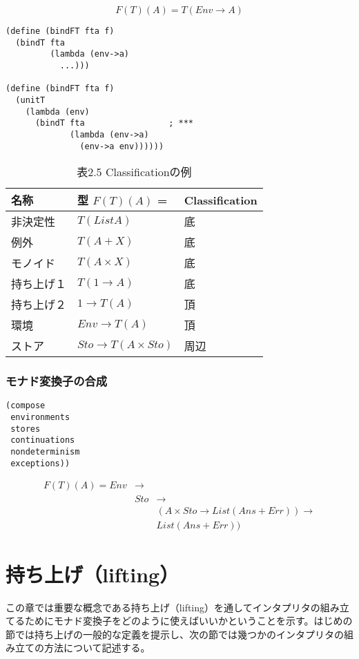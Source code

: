 \documentclass[11pt, oneside]{jsbook}   	%
\begin{document}
$$
F(T)(A) = T(Env \rightarrow A)
$$

\begin{lstlisting}
(define (bindFT fta f)
  (bindT fta
         (lambda (env->a)
           ...)))

(define (bindFT fta f)
  (unitT
    (lambda (env)
      (bindT fta                 ; ***
             (lambda (env->a)
               (env->a env))))))
\end{lstlisting}

\begin{table}[htb]
\label{table2.5}
\caption{表2.5 Classificationの例}
  \begin{tabular}{| l | l | l |} \hline
    名称   & 型 $F(T)(A)$ = & Classification  \\ \hline \hline
    非決定性     & $T(List A)$ & 底  \\
    例外            & $T(A + X)$ & 底  \\
    モノイド     & $T(A \times X)$ & 底  \\
    持ち上げ１ & $T(1 \rightarrow A)$ & 底  \\
    持ち上げ２ & $1 \rightarrow T(A) $ & 頂  \\
    環境            & $Env \rightarrow T(A) $ & 頂  \\ 
    ストア        &  $Sto \rightarrow T(A \times Sto) $ & 周辺  \\ \hline
  \end{tabular}
\end{table}
\subsection{ モナド変換子の合成 }

\begin{lstlisting}
(compose
 environments
 stores
 continuations
 nondeterminism
 exceptions))
\end{lstlisting}
 
 $$
\begin{array}{lll}
F(T)(A) = Env &\rightarrow 	& 				 \\
			   &Sto 			&\rightarrow  	 \\
			   &				& (A \times  Sto \rightarrow List(Ans + Err)) \rightarrow \\
			   &				&				 List(Ans + Err))
\end{array}
 $$
 
\theendnotes
\setcounter{endnote}{0}

\newpage
\chapter{ 持ち上げ（lifting）}
 この章では重要な概念である持ち上げ（lifting）を通してインタプリタの組み立てるためにモナド変換子をどのように使えばいいかということを示す。はじめの節では持ち上げの一般的な定義を提示し、次の節では幾つかのインタプリタの組み立ての方法について記述する。
\end{document}
